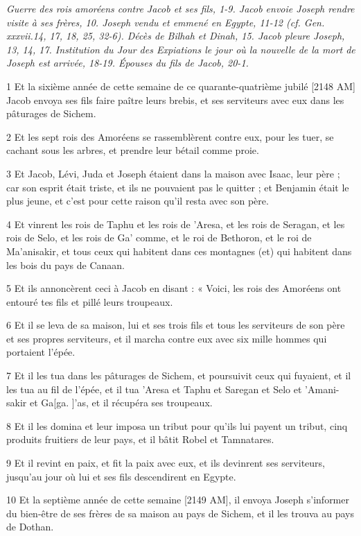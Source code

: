 
\par \textit{Guerre des rois amoréens contre Jacob et ses fils, 1-9. Jacob envoie Joseph rendre visite à ses frères, 10. Joseph vendu et emmené en Egypte, 11-12 (cf. Gen. xxxvii.14, 17, 18, 25, 32-6). Décès de Bilhah et Dinah, 15. Jacob pleure Joseph, 13, 14, 17. Institution du Jour des Expiations le jour où la nouvelle de la mort de Joseph est arrivée, 18-19. Épouses du fils de Jacob, 20-1.}

\par 1 Et la sixième année de cette semaine de ce quarante-quatrième jubilé [2148 AM] Jacob envoya ses fils faire paître leurs brebis, et ses serviteurs avec eux dans les pâturages de Sichem.
\par 2 Et les sept rois des Amoréens se rassemblèrent contre eux, pour les tuer, se cachant sous les arbres, et prendre leur bétail comme proie.
\par 3 Et Jacob, Lévi, Juda et Joseph étaient dans la maison avec Isaac, leur père ; car son esprit était triste, et ils ne pouvaient pas le quitter ; et Benjamin était le plus jeune, et c'est pour cette raison qu'il resta avec son père.
\par 4 Et vinrent les rois de Taphu et les rois de 'Aresa, et les rois de Seragan, et les rois de Selo, et les rois de Ga' comme, et le roi de Bethoron, et le roi de Ma'anisakir, et tous ceux qui habitent dans ces montagnes (et) qui habitent dans les bois du pays de Canaan.
\par 5 Et ils annoncèrent ceci à Jacob en disant : « Voici, les rois des Amoréens ont entouré tes fils et pillé leurs troupeaux.
\par 6 Et il se leva de sa maison, lui et ses trois fils et tous les serviteurs de son père et ses propres serviteurs, et il marcha contre eux avec six mille hommes qui portaient l'épée.
\par 7 Et il les tua dans les pâturages de Sichem, et poursuivit ceux qui fuyaient, et il les tua au fil de l'épée, et il tua 'Aresa et Taphu et Saregan et Selo et 'Amani-sakir et Ga[ga. ]'as, et il récupéra ses troupeaux.
\par 8 Et il les domina et leur imposa un tribut pour qu'ils lui payent un tribut, cinq produits fruitiers de leur pays, et il bâtit Robel et Tamnatares.
\par 9 Et il revint en paix, et fit la paix avec eux, et ils devinrent ses serviteurs, jusqu'au jour où lui et ses fils descendirent en Egypte.
\par 10 Et la septième année de cette semaine [2149 AM], il envoya Joseph s'informer du bien-être de ses frères de sa maison au pays de Sichem, et il les trouva au pays de Dothan.
